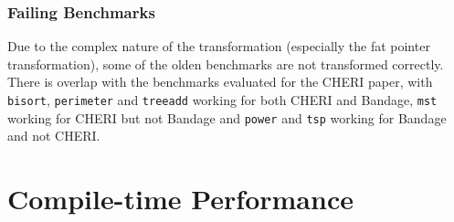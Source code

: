 \subsubsection{Failing Benchmarks}

Due to the complex nature of the transformation (especially the fat pointer transformation), some of the olden benchmarks are not transformed correctly.
There is overlap with the benchmarks evaluated for the CHERI paper, with \verb!bisort!, \verb!perimeter! and \verb!treeadd! working for both CHERI and Bandage, \verb!mst! working for CHERI but not Bandage and \verb!power! and \verb!tsp! working for Bandage and not CHERI.


%
%
%
%

\section{Compile-time Performance}

